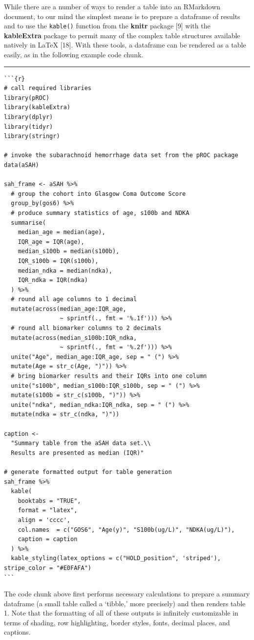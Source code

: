 \documentclass[]{elsarticle} %
\begin{document}
While there are a number of ways to render a table into an RMarkdown
document, to our mind the simplest means is to prepare a dataframe of
results and to use the \texttt{kable()} function from the \textbf{knitr}
package {[}9{]} with the \textbf{kableExtra} package to permit many of
the complex table structures available natively in LaTeX {[}18{]}. With
these tools, a dataframe can be rendered as a table easily, as in the
following example code chunk.

\begin{center}\rule{0.5\linewidth}{0.5pt}\end{center}

\begin{verbatim}
```{r}
# call required libraries
library(pROC) 
library(kableExtra)
library(dplyr)
library(tidyr)
library(stringr)

# invoke the subarachnoid hemorrhage data set from the pROC package
data(aSAH) 

sah_frame <- aSAH %>%
  # group the cohort into Glasgow Coma Outcome Score 
  group_by(gos6) %>% 
  # produce summary statistics of age, s100b and NDKA
  summarise(
    median_age = median(age), 
    IQR_age = IQR(age),
    median_s100b = median(s100b),
    IQR_s100b = IQR(s100b),
    median_ndka = median(ndka),
    IQR_ndka = IQR(ndka)
  ) %>%
  # round all age columns to 1 decimal
  mutate(across(median_age:IQR_age,
                ~ sprintf(., fmt = '%.1f'))) %>%
  # round all biomarker columns to 2 decimals
  mutate(across(median_s100b:IQR_ndka,
                ~ sprintf(., fmt = '%.2f'))) %>%
  unite("Age", median_age:IQR_age, sep = " (") %>%
  mutate(Age = str_c(Age, ")")) %>%
  # bring biomarker results and their IQRs into one column
  unite("s100b", median_s100b:IQR_s100b, sep = " (") %>%
  mutate(s100b = str_c(s100b, ")")) %>%
  unite("ndka", median_ndka:IQR_ndka, sep = " (") %>%
  mutate(ndka = str_c(ndka, ")"))

caption <-
  "Summary table from the aSAH data set.\\
  Results are presented as median (IQR)"

# generate formatted output for table generation
sah_frame %>%
  kable(
    booktabs = "TRUE",
    format = "latex",
    align = 'cccc',
    col.names  = c("GOS6", "Age(y)", "S100b(ug/L)", "NDKA(ug/L)"),
    caption = caption
  ) %>%
  kable_styling(latex_options = c("HOLD_position", 'striped'), stripe_color = "#E0FAFA")
```
\end{verbatim}

\noindent The code chunk above first performs necessary calculations to
prepare a summary dataframe (a small table called a `tibble,' more
precisely) and then renders table 1. Note that the formatting of all of
these outputs is infinitely customizable in terms of shading, row
highlighting, border styles, fonts, decimal places, and captions.
\end{document}
